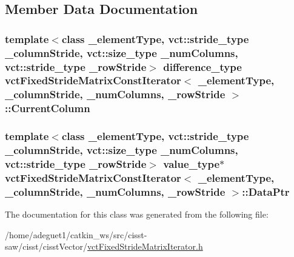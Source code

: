 \subsection{Member Data Documentation}
\hypertarget{classvct_fixed_stride_matrix_const_iterator_a2e5d93bb3d47edb6e75d294a520f6f32}{
\subsubsection[{Current\-Column}]{\setlength{\rightskip}{0pt plus 5cm}template$<$class \-\_\-element\-Type, vct\-::stride\-\_\-type \-\_\-column\-Stride, vct\-::size\-\_\-type \-\_\-num\-Columns, vct\-::stride\-\_\-type \-\_\-row\-Stride$>$ difference\-\_\-type {\bf vct\-Fixed\-Stride\-Matrix\-Const\-Iterator}$<$ \-\_\-element\-Type, \-\_\-column\-Stride, \-\_\-num\-Columns, \-\_\-row\-Stride $>$\-::Current\-Column\hspace{0.3cm}{\ttfamily [protected]}}}\label{classvct_fixed_stride_matrix_const_iterator_a2e5d93bb3d47edb6e75d294a520f6f32}
\hypertarget{classvct_fixed_stride_matrix_const_iterator_afcb4fd9b3a426eaa6b28e36d741a4b24}{
\subsubsection[{Data\-Ptr}]{\setlength{\rightskip}{0pt plus 5cm}template$<$class \-\_\-element\-Type, vct\-::stride\-\_\-type \-\_\-column\-Stride, vct\-::size\-\_\-type \-\_\-num\-Columns, vct\-::stride\-\_\-type \-\_\-row\-Stride$>$ value\-\_\-type$\ast$ {\bf vct\-Fixed\-Stride\-Matrix\-Const\-Iterator}$<$ \-\_\-element\-Type, \-\_\-column\-Stride, \-\_\-num\-Columns, \-\_\-row\-Stride $>$\-::Data\-Ptr\hspace{0.3cm}{\ttfamily [protected]}}}\label{classvct_fixed_stride_matrix_const_iterator_afcb4fd9b3a426eaa6b28e36d741a4b24}


The documentation for this class was generated from the following file\-:\begin{DoxyCompactItemize}
\item 
/home/adeguet1/catkin\-\_\-ws/src/cisst-\/saw/cisst/cisst\-Vector/\hyperlink{vct_fixed_stride_matrix_iterator_8h}{vct\-Fixed\-Stride\-Matrix\-Iterator.\-h}\end{DoxyCompactItemize}

